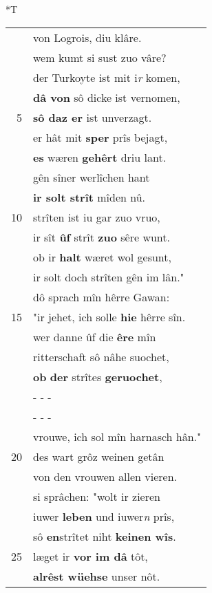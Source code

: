 \documentclass[8pt,a4paper,notitlepage]{article}
\begin{document}
\begin{table}[ht]
\begin{minipage}[t]{0.5\linewidth}
\end{minipage}
\hspace{0.5cm}
\begin{minipage}[t]{0.5\linewidth}
\small
\begin{center}*T
\end{center}
\begin{tabular}{rl}
 & von Logrois, diu klâre.\\ 
 & wem kumt si sust zuo vâre?\\ 
 & der Turkoyte ist mit i\textit{r} komen,\\ 
 & \textbf{dâ von} sô dicke ist vernomen,\\ 
5 & \textbf{sô daz er} ist unverzagt.\\ 
 & er hât mit \textbf{sper} prîs bejagt,\\ 
 & \textbf{es} wæren \textbf{gehêrt} driu lant.\\ 
 & gên sîner werlîchen hant\\ 
 & \textbf{ir solt strît} mîden nû.\\ 
10 & strîten ist iu gar zuo vruo,\\ 
 & ir sît \textbf{ûf} strît \textbf{zuo} sêre wunt.\\ 
 & ob ir \textbf{halt} wæret wol gesunt,\\ 
 & ir solt doch strîten gên im lân."\\ 
 & dô sprach mîn hêrre Gawan:\\ 
15 & "ir jehet, ich solle \textbf{hie} hêrre sîn.\\ 
 & wer danne ûf die \textbf{êre} mîn\\ 
 & ritterschaft sô nâhe suochet,\\ 
 & \textbf{ob} \textbf{der} strîtes \textbf{geruochet},\\ 
 & \multicolumn{1}{l}{ - - - }\\ 
 & \multicolumn{1}{l}{ - - - }\\ 
 & vrouwe, ich sol mîn harnasch hân."\\ 
20 & des wart grôz weinen getân\\ 
 & von den vrouwen allen vieren.\\ 
 & si sprâchen: "wolt ir zieren\\ 
 & iuwer \textbf{leben} und iuwer\textit{n} prîs,\\ 
 & sô \textbf{en}strîtet niht \textbf{keinen wîs}.\\ 
25 & læget ir \textbf{vor im dâ} tôt,\\ 
 & \textbf{alrêst wüehse} unser nôt.\\ 

\end{tabular}
\end{minipage}
\end{table}
\end{document}
